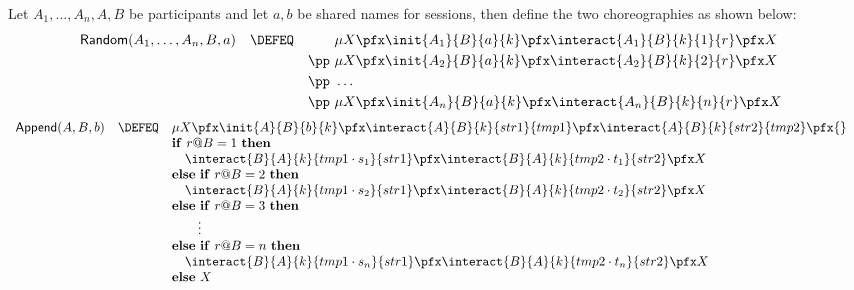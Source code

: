\begin{definition}\label{Logic4Struct:def:PCPencoding}

  Let $A_1,\dots,A_n,A,B$ be participants and let $a,b$ be shared names for
  sessions, then define the two choreographies as shown below:
  \begin{align*}
    &
    \begin{array}{rcl}
      \textsf{Random}(A_1,\dots,A_n,B,a) &
      \DEFEQ &
      \phantom{{}\pp\ {}}\mu X \pfx
      \init{A_1}{B}{a}{k} \pfx
      \interact{A_1}{B}{k}{1}{r} \pfx X\\[1mm]
      &&
      \pp\ \mu X \pfx
      \init{A_2}{B}{a}{k} \pfx
      \interact{A_2}{B}{k}{2}{r} \pfx X\\[1mm]
      &&
      \pp\ \ldots\\[1mm]
      &&
      \pp\ \mu X \pfx
      \init{A_n}{B}{a}{k} \pfx
      \interact{A_n}{B}{k}{n}{r} \pfx X
      \end{array}
\end{align*}
\begin{align*}
    &
    \begin{array}{rcl}
      \textsf{Append}(A,B,b) &
      \DEFEQ &
      \mu X\pfx
      \init{A}{B}{b}{k} \pfx
      \interact{A}{B}{k}{str1}{tmp1} \pfx
      \interact{A}{B}{k}{str2}{tmp2} \pfx {} \\
      &
      &
      \mathbf{if}\ r@B = 1\ \mathbf{then} \\
      &
      &
      \quad
      \interact{B}{A}{k}{tmp1 \cdot s_1}{str1} \pfx
      \interact{B}{A}{k}{tmp2 \cdot t_1}{str2} \pfx X \\
      &
      &
      \mathbf{else}\ \mathbf{if}\ r@B = 2\ \mathbf{then} \\
      &
      &
      \quad
      \interact{B}{A}{k}{tmp1 \cdot s_2}{str1} \pfx
      \interact{B}{A}{k}{tmp2 \cdot t_2}{str2} \pfx X \\
      &
      &
      \mathbf{else} \ \mathbf{if}\ r@B = 3\ \mathbf{then} \\
      &
      &
      \qquad \vdots \\
      &
      &
      \mathbf{else} \ \mathbf{if}\ r@B = n\ \mathbf{then} \\
      &
      &
      \quad
      \interact{B}{A}{k}{tmp1 \cdot s_n}{str1} \pfx
      \interact{B}{A}{k}{tmp2 \cdot t_n}{str2} \pfx X \\
      &
      &
      \mathbf{else }\ X
    \end{array}
  \end{align*}

\end{definition}
